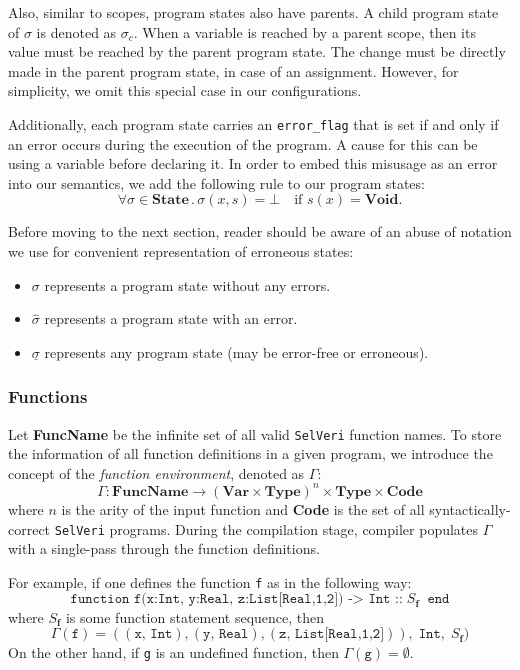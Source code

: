 \documentclass{article}
\begin{document}
Also, similar to scopes, program states also have parents. A child program state of $\sigma$ is denoted as $\sigma_c$. When a variable is reached by a parent scope, then its value must be reached by the parent program state. The change must be directly made in the parent program state, in case of an assignment. However, for simplicity, we omit this special case in our configurations.

Additionally, each program state carries an \texttt{error\_flag} that is set if and only if an error occurs during the execution of the program. A cause for this can be using a variable before declaring it. In order to embed this misusage as an error into our semantics, we add the following rule to our program states:
\[
\forall \sigma \in \textbf{State} \, . \, \sigma(x,s) = \bot \quad \text{if } s(x) = \textbf{Void}.
\]

Before moving to the next section, reader should be aware of an abuse of notation we use for convenient representation of erroneous states:
\begin{itemize}
    \item $\sigma$ represents a program state without any errors.
    \item $\hat{\sigma}$ represents a program state with an error.
    \item $\underline{\sigma}$ represents any program state (may be error-free or erroneous).
\end{itemize}

\newpage
\subsubsection{Functions}

Let \textbf{FuncName} be the infinite set of all valid \texttt{SelVeri} function names. To store the information of all function definitions in a given program, we introduce the concept of the \textit{function environment}, denoted as $\Gamma$:
\[
\Gamma : \textbf{FuncName} \rightarrow (\textbf{Var} \times \textbf{Type})^n \times \textbf{Type} \times \textbf{Code}
\] where $n$ is the arity of the input function and \textbf{Code} is the set of all syntactically-correct \texttt{SelVeri} programs. During the compilation stage, compiler populates $\Gamma$ with a single-pass through the function definitions.

For example, if one defines the function \texttt{f} as in the following way:
\[
\texttt{function f(x:Int, y:Real, z:List[Real,1,2]) -> Int ::}\; S_\textbf{f} \;\;\texttt{end}
\]
where $S_\textbf{f}$ is some function statement sequence, then 
\[
\Gamma(\texttt{f}) = ((\texttt{x},\, \texttt{Int}), (\texttt{y},\, \texttt{Real}),(\texttt{z},\, \texttt{List[Real,1,2]})),\; \texttt{Int},\; S_\textbf{f})
\]
On the other hand, if \texttt{g} is an undefined function, then $\Gamma(\texttt{g}) = \emptyset$.
\end{document}
